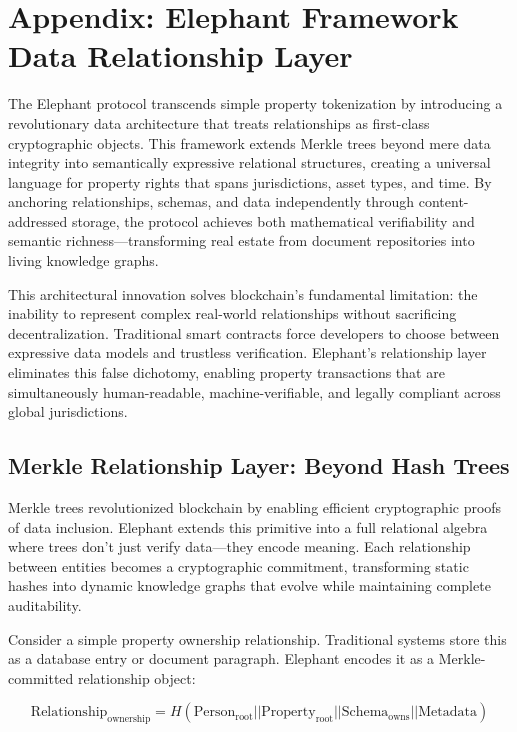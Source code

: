 \chapter{Appendix: Elephant Framework Data Relationship Layer}

The Elephant protocol transcends simple property tokenization by introducing a revolutionary data architecture that treats relationships as first-class cryptographic objects. This framework extends Merkle trees beyond mere data integrity into semantically expressive relational structures, creating a universal language for property rights that spans jurisdictions, asset types, and time. By anchoring relationships, schemas, and data independently through content-addressed storage, the protocol achieves both mathematical verifiability and semantic richness—transforming real estate from document repositories into living knowledge graphs.

This architectural innovation solves blockchain's fundamental limitation: the inability to represent complex real-world relationships without sacrificing decentralization. Traditional smart contracts force developers to choose between expressive data models and trustless verification. Elephant's relationship layer eliminates this false dichotomy, enabling property transactions that are simultaneously human-readable, machine-verifiable, and legally compliant across global jurisdictions.

\section{Merkle Relationship Layer: Beyond Hash Trees}

Merkle trees revolutionized blockchain by enabling efficient cryptographic proofs of data inclusion. Elephant extends this primitive into a full relational algebra where trees don't just verify data—they encode meaning. Each relationship between entities becomes a cryptographic commitment, transforming static hashes into dynamic knowledge graphs that evolve while maintaining complete auditability.

Consider a simple property ownership relationship. Traditional systems store this as a database entry or document paragraph. Elephant encodes it as a Merkle-committed relationship object:

\[
\text{Relationship}_{\text{ownership}} = H(\text{Person}_{\text{root}} || \text{Property}_{\text{root}} || \text{Schema}_{\text{owns}} || \text{Metadata})
\]

